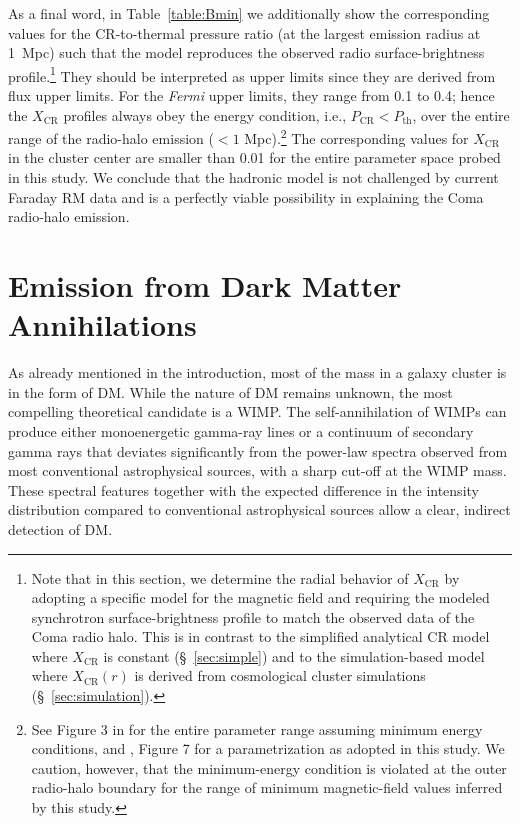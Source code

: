 \documentclass[12pt,manuscript]{aastex}
\def\Fermi{{\em Fermi}\xspace}
\newcommand{\CR}{\mathrm{CR}}
\begin{document}
As a final word, in Table~\ref{table:Bmin} we additionally show the corresponding values for the
CR-to-thermal pressure ratio (at the largest emission radius at 1~Mpc) such that the model
reproduces the observed radio surface-brightness profile.\footnote{Note that in this section, we
determine the radial behavior of $X_\CR$ by adopting a specific model for the magnetic field and
requiring the modeled synchrotron surface-brightness profile to match the observed data of the
Coma radio halo. This is in contrast to the simplified analytical CR model where $X_\CR$ is
constant (\S~\ref{sec:simple}) and to the simulation-based model where $X_\CR(r)$ is derived from
cosmological cluster simulations (\S~\ref{sec:simulation}).} They should be interpreted as upper
limits since they are derived from flux upper limits. For the \Fermi upper limits, they range from
0.1 to 0.4; hence the $X_{\CR}$ profiles always obey the energy condition, i.e., $P_{\CR} <
P_{\mathrm{th}}$, over the entire range of the radio-halo emission ($< 1$ Mpc).\footnote{See Figure
  3 in \citet{article:PfrommerEnsslin:2004a} for the entire parameter range assuming minimum energy
  conditions, and \citet{article:PfrommerEnsslin:2004b}, Figure 7 for a parametrization as adopted
  in this study. We caution, however, that the minimum-energy condition is violated at the outer
  radio-halo boundary for the range of minimum magnetic-field values inferred by this study.} The
corresponding values for $X_\CR$ in the cluster center are smaller than 0.01 for the entire
parameter space probed in this study. We conclude that the hadronic model is not challenged by
current Faraday RM data and is a perfectly viable possibility in explaining the Coma radio-halo
emission.

%
%

\section{Emission from Dark Matter Annihilations}
As already mentioned in the introduction, most of the mass in a galaxy cluster is in the form of
DM. While the nature of DM remains unknown, the most compelling theoretical candidate is a
WIMP. The self-annihilation of WIMPs can produce either monoenergetic gamma-ray lines or a
continuum of secondary gamma rays that deviates significantly from the power-law spectra observed
from most conventional astrophysical sources, with a sharp cut-off at the WIMP mass. These spectral
features together with the expected difference in the intensity distribution compared to
conventional astrophysical sources allow a clear, indirect detection of DM.
\end{document}

